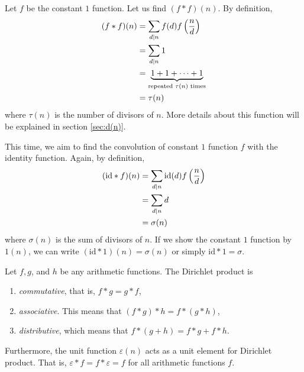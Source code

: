 	\begin{example}
		Let $f$ be the constant $1$ function. Let us find $(f \ast f)(n)$. By definition,
			\begin{align*}
				(f \ast f)(n) & =  \sum_{d\mid n}f(d)f\left(\frac nd\right)\\
					  & =  \sum_{d\mid n} 1\\
					  & =  \underbrace{1 + 1 + \cdots + 1}_{\text{repeated } \tau(n) \text{ times}}\\
					  & =  \tau(n)
			\end{align*}
		where $\tau(n)$ is the number of divisors of $n$. More details about this function will be explained in section \ref{sec:d(n)}.
	\end{example}

	\begin{example}
		This time, we aim to find the convolution of constant $1$ function $f$ with the identity function. Again, by definition,
			\begin{align*}
				(\text{id} \ast f )(n) & = \sum_{d\mid n}\text{id}(d)f\left(\frac nd\right)\\
					       & = \sum_{d\mid n} d\\
						   & = \sigma(n)
				\end{align*}
		where $\sigma(n)$ is the sum of divisors of $n$. If we show the constant $1$ function by $1(n)$, we can write $(\text{id} \ast 1)(n)=\sigma(n)$ or simply $\text{id} \ast 1 = \sigma$.
	\end{example}

	\begin{proposition} \label{prop:convolutionproperties}
		Let $f, g$, and $h$ be any arithmetic functions. The Dirichlet product is
		\begin{enumerate}
			\item \textit{commutative}, that is, $f\ast g = g \ast f$,
			\item \textit{associative}. This means that $(f \ast g) \ast h = f\ast (g\ast h)$,
			\item \textit{distributive}, which means that $f\ast (g+h) = f\ast g+ f\ast h$.
		\end{enumerate}
		Furthermore, the unit function $\varepsilon(n)$ acts as a unit element for Dirichlet product. That is, $\varepsilon\ast f = f \ast \varepsilon = f$ for all arithmetic functions $f$.
	\end{proposition}

